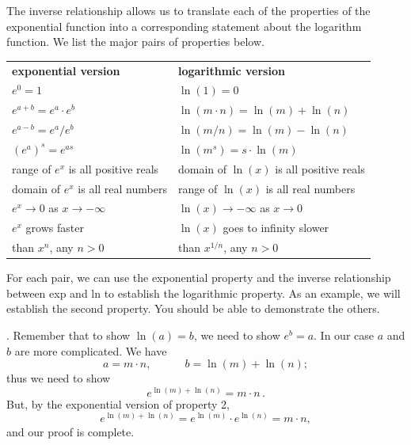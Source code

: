 The inverse relationship allows us to translate each of the properties
of the exponential function into a corresponding statement about the
logarithm function. We list the major pairs of properties below.
\begin{center}


\begin{tabular}{ll}

{\bf exponential version} & {\bf logarithmic version}\\[5pt]
  $e^{0}=1$          & $\ln(1)=0$\\
  $e^{\displaystyle a+b}=e^{\displaystyle a}\cdot e^{\displaystyle b}$            & $\ln(m\cdot n)=\ln(m) + \ln(n)$\\
  $e^{\displaystyle a-b} = e^{\displaystyle a}/e^{\displaystyle b}$               & $\ln(m/n) = \ln(m) - \ln(n)$ \\
  $(e^{\displaystyle a})^{\displaystyle s} = e^{\displaystyle as}$                & $\ln(m^s) = s \cdot \ln(m)$ \\
 range of $e^{\displaystyle x}$ is all positive reals & domain of $\ln(x)$ is all positive reals\\
domain of $e^{\displaystyle x}$ is all real numbers & range of $\ln(x)$ is all real numbers \\
$e^{\displaystyle x} \to 0$ as $x \to -\infty$ &
	$\ln(x) \to -\infty$ as $x \to 0$ \\
$e^{\displaystyle x}$ grows faster & $\ln(x)$ goes to infinity slower\\
\hspace{.25in} than $x^n$, any $n> 0$ & \hspace{.25in} than $x^{1/n}$, any  $n > 0$
\end{tabular}
\end{center}
For each pair, we can use the exponential property and the inverse
relationship between exp and ln to establish the logarithmic property.
As an example, we will establish the second property.  You should be
able to demonstrate the others.




. Remember that to show
$\ln(a)=b$, we need to show $e^b=a$.  In our case $a$ and $b$ are more
complicated.  We have
\[
a =  m\cdot n,  \qquad\quad
b =  \ln(m)+\ln(n);
\]
thus we need to show
\[
e^{\displaystyle \ln(m)+\ln(n)} = m \cdot n \, .
\]
But, by the exponential version of property 2, 
	\[
e^{\displaystyle \ln(m)+\ln(n)} = 
		e^{\displaystyle \ln(m)} \cdot
		e^{\displaystyle \ln(n)} = m \cdot n,
\]
and our proof is complete.

